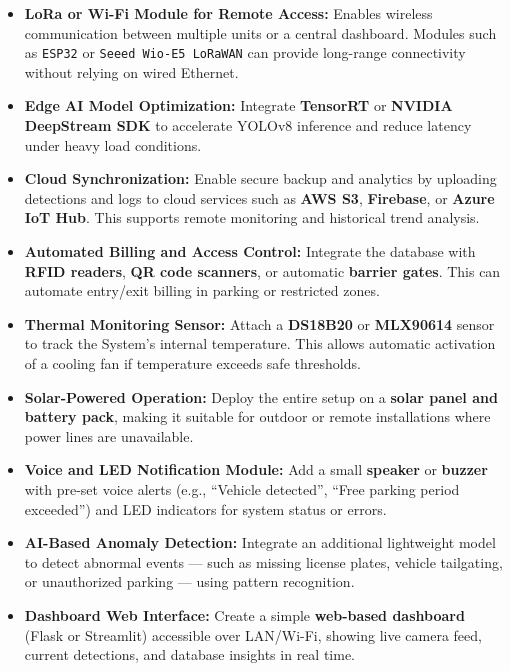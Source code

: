 \begin{itemize}
	\item \textbf{LoRa or Wi-Fi Module for Remote Access:}  
	Enables wireless communication between multiple  units or a central dashboard.  
	Modules such as \texttt{ESP32} or \texttt{Seeed Wio-E5 LoRaWAN} can provide long-range connectivity without relying on wired Ethernet.
	
	\item \textbf{Edge AI Model Optimization:}  
	Integrate \textbf{TensorRT} or \textbf{NVIDIA DeepStream SDK} to accelerate YOLOv8 inference and reduce latency under heavy load conditions.
	
	\item \textbf{Cloud Synchronization:}  
	Enable secure backup and analytics by uploading detections and logs to cloud services such as \textbf{AWS S3}, \textbf{Firebase}, or \textbf{Azure IoT Hub}.  
	This supports remote monitoring and historical trend analysis.
	
	\item \textbf{Automated Billing and Access Control:}  
	Integrate the database with \textbf{RFID readers}, \textbf{QR code scanners}, or automatic \textbf{barrier gates}.  
	This can automate entry/exit billing in parking or restricted zones.
	
	\item \textbf{Thermal Monitoring Sensor:}  
	Attach a \textbf{DS18B20} or \textbf{MLX90614} sensor to track the System’s internal temperature.  
	This allows automatic activation of a cooling fan if temperature exceeds safe thresholds.
	
	\item \textbf{Solar-Powered Operation:}  
	Deploy the entire setup on a \textbf{solar panel and battery pack}, making it suitable for outdoor or remote installations where power lines are unavailable.
	
	\item \textbf{Voice and LED Notification Module:}  
	Add a small \textbf{speaker} or \textbf{buzzer} with pre-set voice alerts (e.g., “Vehicle detected”, “Free parking period exceeded”) and LED indicators for system status or errors.
	
	\item \textbf{AI-Based Anomaly Detection:}  
	Integrate an additional lightweight model to detect abnormal events — such as missing license plates, vehicle tailgating, or unauthorized parking — using pattern recognition.
	
	\item \textbf{Dashboard Web Interface:}  
	Create a simple \textbf{web-based dashboard} (Flask or Streamlit) accessible over LAN/Wi-Fi, showing live camera feed, current detections, and database insights in real time.
	

\end{itemize}

